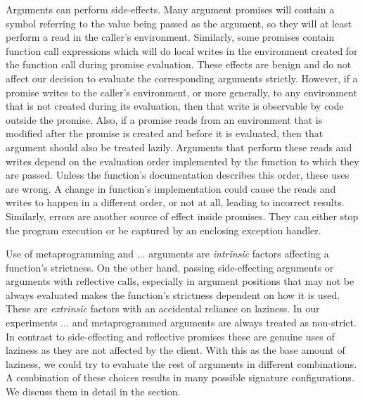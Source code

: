 \documentclass[review,nonacm,screen,acmsmall,anonymous=true]{acmart}
\begin{document}
Arguments can perform side-effects. Many argument promises will contain a symbol
referring to the value being passed as the argument, so they will at least
perform a read in the caller's environment. Similarly, some promises contain
function call expressions which will do local writes in the environment created
for the function call during promise evaluation. These effects are benign and do
not affect our decision to evaluate the corresponding arguments strictly.
However, if a promise writes to the caller's environment, or more generally, to
any environment that is not created during its evaluation, then that write is
observable by code outside the promise. Also, if a promise reads from an
environment that is modified after the promise is created and before it is
evaluated, then that argument should also be treated lazily. Arguments that
perform these reads and writes depend on the evaluation order implemented by the
function to which they are passed. Unless the function's documentation describes
this order, these uses are wrong. A change in function's implementation could
cause the reads and writes to happen in a different order, or not at all,
leading to incorrect results. Similarly, errors are another source of effect
inside promises. They can either stop the program execution or be captured by an
enclosing exception handler.

Use of metaprogramming and $...$ arguments are \emph{intrinsic} factors
affecting a function's strictness. On the other hand, passing side-effecting
arguments or arguments with reflective calls, especially in argument positions
that may not be always evaluated makes the function's strictness dependent on
how it is used. These are \emph{extrinsic} factors with an accidental reliance
on laziness. In our experiments $...$ and metaprogrammed arguments are always
treated as non-strict. In contrast to side-effecting and reflective promises
these are genuine uses of laziness as they are not affected by the client. With
this as the base amount of laziness, we could try to evaluate the rest of
arguments in different combinations. A combination of these choices results in
many possible signature configurations. We discuss them in detail in the
 section.
\end{document}
